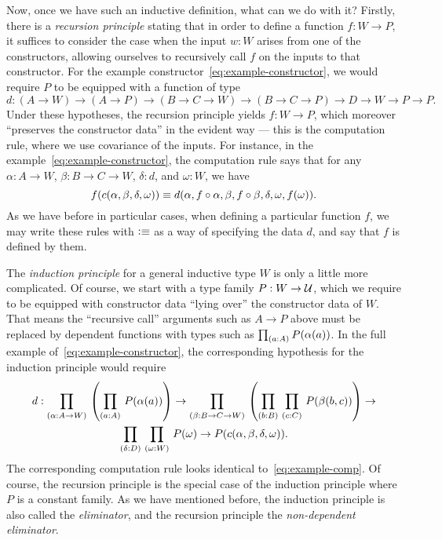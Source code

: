 Now, once we have such an inductive definition, what can we do with it?
Firstly, there is a \emph{recursion principle} stating that in order to define a function $f:W\to P$, it suffices to consider the case when the input $w:W$ arises from one of the constructors, allowing ourselves to recursively call $f$ on the inputs to that constructor.
For the example constructor~\eqref{eq:example-constructor}, we would require $P$ to be equipped with a function of type
\begin{equation}\label{eq:example-rechyp}
  d:(A\to W) \to (A\to P) \to (B\to C\to W) \to (B\to C \to P) \to D \to W \to P \to P.
\end{equation}
Under these hypotheses, the recursion principle yields $f:W\to P$, which moreover ``preserves the constructor data'' in the evident way --- this is the computation rule, where we use covariance of the inputs.
For instance, in the example~\eqref{eq:example-constructor}, the computation rule says that for any $\alpha:A\to W$, $\beta:B\to C\to W$, $\delta:d$, and $\omega:W$, we have
\begin{equation}
  f(c(\alpha,\beta,\delta,\omega)) \jdeq d(\alpha,f\circ \alpha,\beta, f\circ \beta, \delta, \omega,f(\omega)).\label{eq:example-comp}
\end{equation}
As we have before in particular cases, when defining a particular function $f$, we may write these rules with $\vcentcolon\equiv$ as a way of specifying the data $d$, and say that $f$ is defined by them.

The \emph{induction principle} for a general inductive type $W$ is only a little more complicated.
Of course, we start with a type family $P:W\to\mathcal{U}$, which we require to be equipped with constructor data ``lying over'' the constructor data of $W$.
That means the ``recursive call'' arguments such as $A\to P$ above must be replaced by dependent functions with types such as $\prd{a:A} P(\alpha(a))$.
In the full example of~\eqref{eq:example-constructor}, the corresponding hypothesis for the induction principle would require
\begin{multline}\label{eq:example-indhyp}
d : \dprd{\alpha:A\to W}\left(\dprd{a:A} P(\alpha(a))\right) \to
\dprd{\beta:B\to C\to W} \left(\dprd{b:B}{c:C} P(\beta(b,c))\right) \to\\
\dprd{\delta:D}
\dprd{\omega:W} P(\omega) \to
P(c(\alpha,\beta,\delta,\omega)).
\end{multline}
The corresponding computation rule looks identical to~\eqref{eq:example-comp}.
Of course, the recursion principle is the special case of the induction principle where $P$ is a constant family.
As we have mentioned before, the induction principle is also called the \emph{eliminator}, and the recursion principle the \emph{non-dependent eliminator}.

